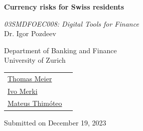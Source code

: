 \documentclass[a4paper,11pt,oneside]{article}
\begin{document}

\thispagestyle{empty}
\vspace{35px}
\vspace{35px}
\begin{center}
\large
\end{center}
\vspace{35px}
\begin{center}
\LARGE \textbf{Currency risks for Swiss residents}
\end{center}
\vspace{10px}
\begin{center}
\large \textit{03SMDFOEC008: Digital Tools for Finance} \\
\vspace{10px}
\large Dr. Igor Pozdeev
\end{center}
\vspace{35px}
\begin{center}
\large Department of Banking and Finance \\
\vspace{5px}
\large University of Zurich \\
\end{center}
\vspace{130px}
\vspace{10px}
\begin{table}[!htbp]
  \centering
  \begin{tabular}{ll}
  \large \href{mailto:thomaswilhelm.meier@uzh.ch}{Thomas Meier} \large \\ [3pt]
  \large \href{mailto:ivo.merki@uzh.ch}{Ivo Merki} \large  \\ [3pt]
  \large  \href{mailto:mateus.siqueirathimoteo@uzh.ch}{Mateus Thimóteo} \large  \\ [3pt]
  \end{tabular}
\end{table}
\vspace{50px}
\begin{center}
\large Submitted on December 19, 2023 \\
\end{center}
\end{document}
